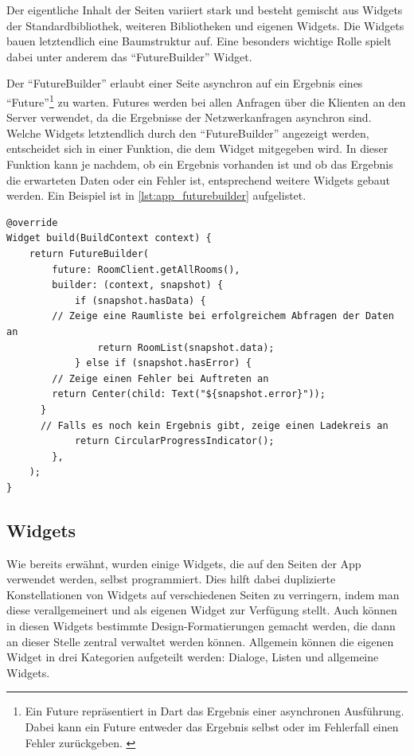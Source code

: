 Der eigentliche Inhalt der Seiten variiert stark und besteht gemischt aus Widgets der Standardbibliothek, weiteren Bibliotheken
und eigenen Widgets.
Die Widgets bauen letztendlich eine Baumstruktur auf.
Eine besonders wichtige Rolle spielt dabei unter anderem das \enquote{FutureBuilder} Widget.

Der \enquote{FutureBuilder} erlaubt einer Seite asynchron auf ein Ergebnis eines \enquote{Future}\footnote{Ein Future repräsentiert in Dart das Ergebnis
einer asynchronen Ausführung. Dabei kann ein Future entweder das Ergebnis selbst oder im Fehlerfall einen Fehler zurückgeben. \cite{dart2020}}
 zu warten.
Futures werden bei allen Anfragen über die Klienten an den Server verwendet, da die Ergebnisse der Netzwerkanfragen asynchron sind.
Welche Widgets letztendlich durch den \enquote{FutureBuilder} angezeigt werden, entscheidet sich in einer Funktion,
die dem Widget mitgegeben wird.
In dieser Funktion kann je nachdem, ob ein Ergebnis vorhanden ist und ob das Ergebnis die erwarteten Daten oder
ein Fehler ist, entsprechend weitere Widgets gebaut werden.
Ein Beispiel ist in \autoref{lst:app_futurebuilder} aufgelistet.

\begin{lstlisting}[caption={Beispiel für die Verwendung des \enquote{FutureBuilder}},label={lst:app_futurebuilder},tabsize=2]
@override
Widget build(BuildContext context) {
	return FutureBuilder(
		future: RoomClient.getAllRooms(),
		builder: (context, snapshot) {
			if (snapshot.hasData) {
        // Zeige eine Raumliste bei erfolgreichem Abfragen der Daten an
				return RoomList(snapshot.data);
			} else if (snapshot.hasError) {
        // Zeige einen Fehler bei Auftreten an
        return Center(child: Text("${snapshot.error}"));
      }
      // Falls es noch kein Ergebnis gibt, zeige einen Ladekreis an
			return CircularProgressIndicator();
		},
	);
}
\end{lstlisting}

\FloatBarrier
\subsection{Widgets}

Wie bereits erwähnt, wurden einige Widgets, die auf den Seiten der App verwendet werden, selbst programmiert.
Dies hilft dabei duplizierte Konstellationen von Widgets auf verschiedenen Seiten zu verringern, indem man diese
verallgemeinert und als eigenen Widget zur Verfügung stellt.
Auch können in diesen Widgets bestimmte Design-Formatierungen gemacht werden, die dann an dieser Stelle zentral verwaltet
werden können.
Allgemein können die eigenen Widget in drei Kategorien aufgeteilt werden:
Dialoge, Listen und allgemeine Widgets.

